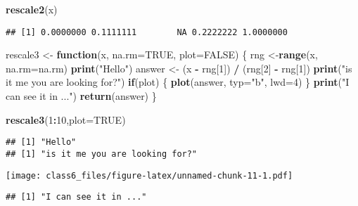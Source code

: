\documentclass[]{article}
\newenvironment{Shaded}{\begin{snugshade}}{\end{snugshade}}
\newcommand{\KeywordTok}[1]{\textcolor[rgb]{0.13,0.29,0.53}{\textbf{#1}}}
\newcommand{\DataTypeTok}[1]{\textcolor[rgb]{0.13,0.29,0.53}{#1}}
\newcommand{\DecValTok}[1]{\textcolor[rgb]{0.00,0.00,0.81}{#1}}
\newcommand{\StringTok}[1]{\textcolor[rgb]{0.31,0.60,0.02}{#1}}
\newcommand{\OtherTok}[1]{\textcolor[rgb]{0.56,0.35,0.01}{#1}}
\newcommand{\ControlFlowTok}[1]{\textcolor[rgb]{0.13,0.29,0.53}{\textbf{#1}}}
\newcommand{\OperatorTok}[1]{\textcolor[rgb]{0.81,0.36,0.00}{\textbf{#1}}}
\newcommand{\NormalTok}[1]{#1}
\begin{document}
\begin{Shaded}
\begin{Highlighting}[]
\KeywordTok{rescale2}\NormalTok{(x)}
\end{Highlighting}
\end{Shaded}

\begin{verbatim}
## [1] 0.0000000 0.1111111        NA 0.2222222 1.0000000
\end{verbatim}

\begin{Shaded}
\begin{Highlighting}[]
\NormalTok{ rescale3 <-}\StringTok{ }\ControlFlowTok{function}\NormalTok{(x, }\DataTypeTok{na.rm=}\OtherTok{TRUE}\NormalTok{, }\DataTypeTok{plot=}\OtherTok{FALSE}\NormalTok{) \{}
\NormalTok{    rng <-}\KeywordTok{range}\NormalTok{(x, }\DataTypeTok{na.rm=}\NormalTok{na.rm)}
    \KeywordTok{print}\NormalTok{(}\StringTok{"Hello"}\NormalTok{)}
\NormalTok{   answer <-}\StringTok{ }\NormalTok{(x }\OperatorTok{-}\StringTok{ }\NormalTok{rng[}\DecValTok{1}\NormalTok{]) }\OperatorTok{/}\StringTok{ }\NormalTok{(rng[}\DecValTok{2}\NormalTok{] }\OperatorTok{-}\StringTok{ }\NormalTok{rng[}\DecValTok{1}\NormalTok{])}
   \KeywordTok{print}\NormalTok{(}\StringTok{"is it me you are looking for?"}\NormalTok{)}
   \ControlFlowTok{if}\NormalTok{(plot) \{}
      \KeywordTok{plot}\NormalTok{(answer, }\DataTypeTok{typ=}\StringTok{"b"}\NormalTok{, }\DataTypeTok{lwd=}\DecValTok{4}\NormalTok{)}
\NormalTok{   \}}
   \KeywordTok{print}\NormalTok{(}\StringTok{"I can see it in ..."}\NormalTok{)}
   \KeywordTok{return}\NormalTok{(answer)}
\NormalTok{\}}
\end{Highlighting}
\end{Shaded}

\begin{Shaded}
\begin{Highlighting}[]
\KeywordTok{rescale3}\NormalTok{(}\DecValTok{1}\OperatorTok{:}\DecValTok{10}\NormalTok{,}\DataTypeTok{plot=}\OtherTok{TRUE}\NormalTok{)}
\end{Highlighting}
\end{Shaded}

\begin{verbatim}
## [1] "Hello"
## [1] "is it me you are looking for?"
\end{verbatim}

\texttt{[image: class6\_files/figure-latex/unnamed-chunk-11-1.pdf]}

\begin{verbatim}
## [1] "I can see it in ..."
\end{verbatim}
\end{document}
